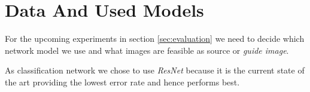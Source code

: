 \section{Data And Used Models}
\label{sec:data}
For the upcoming experiments in section \ref{sec:evaluation} we need to decide which network model we use and what images are feasible as source or \emph{guide image}.

As classification network we chose to use \emph{ResNet} because it is the current state of the art providing the lowest error rate and hence performs best.\cite{cnnComparison}